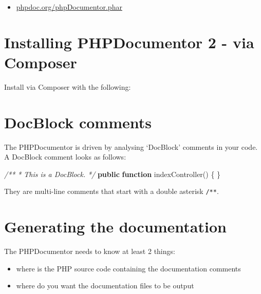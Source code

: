 \documentclass[a4paperpaper,openright]{book}
\newenvironment{Shaded}{}{}
\newcommand{\CommentTok}[1]{\textcolor[rgb]{0.38,0.63,0.69}{\textit{#1}}}
\newcommand{\ExtensionTok}[1]{#1}
\newcommand{\KeywordTok}[1]{\textcolor[rgb]{0.00,0.44,0.13}{\textbf{#1}}}
\newcommand{\NormalTok}[1]{#1}
\newcommand{\OtherTok}[1]{\textcolor[rgb]{0.00,0.44,0.13}{#1}}
\providecommand{\tightlist}{%
  \setlength{\itemsep}{0pt}\setlength{\parskip}{0pt}}
\begin{document}
\begin{itemize}
\tightlist
\item
  \href{https://www.phpdoc.org/phpDocumentor.phar}{phpdoc.org/phpDocumentor.phar}
\end{itemize}

\hypertarget{installing-phpdocumentor-2---via-composer}{%
\section{Installing PHPDocumentor 2 - via
Composer}\label{installing-phpdocumentor-2---via-composer}}

Install via Composer with the following:

\begin{Shaded}
\end{Shaded}

\hypertarget{docblock-comments}{%
\section{DocBlock comments}\label{docblock-comments}}

The PHPDocumentor is driven by analysing `DocBlock' comments in your
code. A DocBlock comment looks as follows:

\begin{Shaded}
\begin{Highlighting}[]
    \CommentTok{/**}
\CommentTok{     * This is a DocBlock.}
\CommentTok{     */}
    \KeywordTok{public} \KeywordTok{function}\NormalTok{ indexController}\OtherTok{()}
\NormalTok{    \{}
\NormalTok{    \}}
\end{Highlighting}
\end{Shaded}

They are multi-line comments that start with a double asterisk
\texttt{/**}.

\hypertarget{generating-the-documentation}{%
\section{Generating the
documentation}\label{generating-the-documentation}}

The PHPDocumentor needs to know at least 2 things:

\begin{itemize}
\item
  where is the PHP source code containing the documentation comments
\item
  where do you want the documentation files to be output
\end{itemize}
\end{document}
